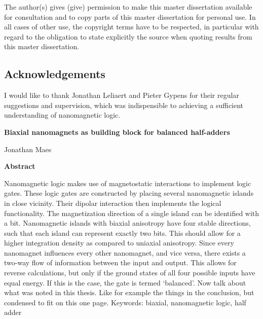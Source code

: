 \documentclass[11pt,a4paper,english]{article}
\begin{document}
\shipout\null %

\newpage
{}

\begin{center}
    The author(s) gives (give) permission to make this master dissertation available for consultation and to copy parts of this master dissertation for personal use. In all cases of other use, the copyright terms have to be respected, in particular with regard to the obligation to state explicitly the source when quoting results from this master dissertation.
\end{center}
\subsection*{Acknowledgements} %
I would like to thank Jonathan Leliaert and Pieter Gypens for their regular suggestions and supervision, which was indispensible to achieving a sufficient understanding of nanomagnetic logic.

\clearpage
\begin{center}
    \Large
    \textbf{Biaxial nanomagnets as building block for balanced half-adders}

    \large
    \vspace{0.4cm}
    Jonathan Maes
       
    \vspace{0.9cm}
    \textbf{Abstract}
\end{center}
Nanomagnetic logic makes use of magnetostatic interactions to implement logic gates. These logic gates are constructed by placing several nanomagnetic islands in close vicinity. Their dipolar interaction then implements the logical functionality. The magnetization direction of a single island can be identified with a bit. Nanomagnetic islands with biaxial anisotropy have four stable directions, such that each island can represent exactly two bits. This should allow for a higher integration density as compared to uniaxial anisotropy. Since every nanomagnet influences every other nanomagnet, and vice versa, there exists a two-way flow of information between the input and output. This allows for reverse calculations, but only if the ground states of all four possible inputs have equal energy. If this is the case, the gate is termed `balanced'.
Now talk about what was noted in this thesis. Like for example the things in the conclusion, but condensed to fit on this one page. %
\vspace*{\fill}
{\small Keywords: biaxial, nanomagnetic logic, half adder}
\end{document}
